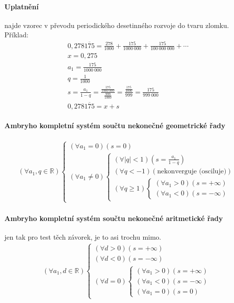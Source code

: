 \documentclass[12pt]{article}
\begin{document}
\paragraph{Uplatnění} najde vzorec v převodu periodického desetinného rozvoje do tvaru zlomku. Příklad:
\begin{align*}
0,278\overline{175} = \frac{278}{1000} + \frac{175}{1000~000} + \frac{175}{100~000~000} + \dotsb\\
x = 0,275\\
a_1 =  \frac{175}{1000~000}\\
q =  \frac{1}{1000}\\
s =  \frac{a_1}{1-q} = \frac{ \frac{175}{1000~000}}{\frac{999}{1000}} =  \frac{ \frac{175}{1000}}{999} =  \frac{175}{999~000}\\
0,278\overline{175} = x + s
\end{align*}
\paragraph{Ambryho kompletní systém součtu nekonečné geometrické řady}
\begin{align}
\left(\forall a_1,q \in \mathbb{R} \right) 
\begin{cases}
   (\forall a_1 = 0)(s =0)\\
   (\forall a_1 \neq 0) \begin{cases}
   ( \forall |q| < 1) ( s = \frac{a_1}{1-q})\\
   ( \forall q < -1) (\text{nekonverguje (osciluje)})\\
   ( \forall q \geq 1)\begin{cases}
   	(\forall a_1 > 0) (s =+ \infty)\\
   	(\forall a_1 < 0) (s =- \infty)
   	\end{cases}
   \end{cases}
\end{cases}
\end{align}
\paragraph{Ambryho kompletní systém součtu nekonečné aritmetické řady} jen tak pro test těch závorek, je to asi trochu mimo.
\begin{align}
( \forall a_1, d \in \mathbb{R}) \begin{cases}
( \forall d>0) (s = + \infty)\\
( \forall d<0) (s = - \infty)\\
( \forall d=0)\begin{cases}
( \forall a_1>0) (s = + \infty)\\
( \forall a_1<0) (s = - \infty)\\
( \forall a_1=0) (s = 0)
\end{cases}
\end{cases}
\end{align}
\end{document}
